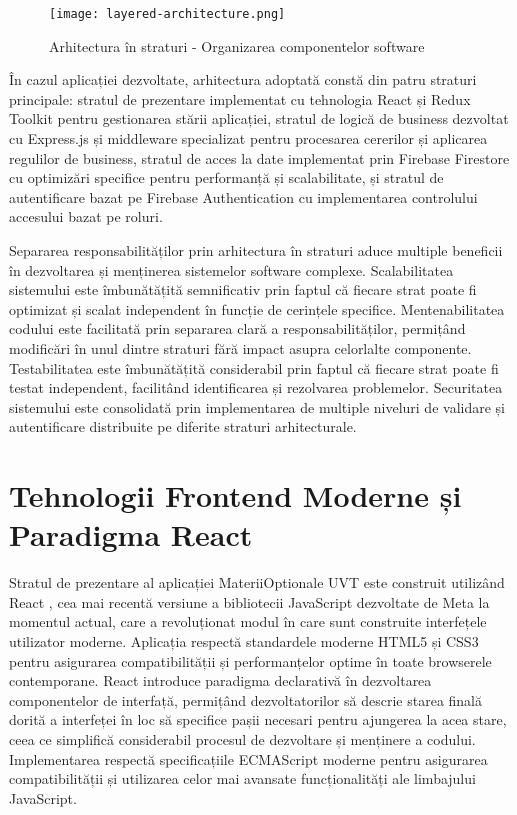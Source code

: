 \documentclass[12pt,a4paper]{report}
\begin{document}
\begin{figure}[H]
\centering
\texttt{[image: layered-architecture.png]}
\caption{Arhitectura în straturi - Organizarea componentelor software}
\label{fig:layered-architecture}
\end{figure}

În cazul aplicației dezvoltate, arhitectura adoptată constă din patru straturi principale: stratul de prezentare implementat cu tehnologia React și Redux Toolkit pentru gestionarea stării aplicației, stratul de logică de business dezvoltat cu Express.js și middleware specializat pentru procesarea cererilor și aplicarea regulilor de business, stratul de acces la date implementat prin Firebase Firestore cu optimizări specifice pentru performanță și scalabilitate, și stratul de autentificare bazat pe Firebase Authentication cu implementarea controlului accesului bazat pe roluri.

Separarea responsabilităților prin arhitectura în straturi aduce multiple beneficii în dezvoltarea și menținerea sistemelor software complexe. Scalabilitatea sistemului este îmbunătățită semnificativ prin faptul că fiecare strat poate fi optimizat și scalat independent în funcție de cerințele specifice. Mentenabilitatea codului este facilitată prin separarea clară a responsabilităților, permițând modificări în unul dintre straturi fără impact asupra celorlalte componente. Testabilitatea este îmbunătățită considerabil prin faptul că fiecare strat poate fi testat independent, facilitând identificarea și rezolvarea problemelor. Securitatea sistemului este consolidată prin implementarea de multiple niveluri de validare și autentificare distribuite pe diferite straturi arhitecturale.



\section{Tehnologii Frontend Moderne și Paradigma React}

Stratul de prezentare al aplicației MateriiOptionale UVT este construit utilizând React \cite{react-docs}, cea mai recentă versiune a bibliotecii JavaScript \cite{javascript-guide} dezvoltate de Meta la momentul actual, care a revoluționat modul în care sunt construite interfețele utilizator moderne. Aplicația respectă standardele moderne HTML5 \cite{html5} și CSS3 \cite{css3} pentru asigurarea compatibilității și performanțelor optime în toate browserele contemporane. React introduce paradigma declarativă în dezvoltarea componentelor de interfață, permițând dezvoltatorilor să descrie starea finală dorită a interfeței în loc să specifice pașii necesari pentru ajungerea la acea stare, ceea ce simplifică considerabil procesul de dezvoltare și menținere a codului. Implementarea respectă specificațiile ECMAScript \cite{ecmascript} moderne pentru asigurarea compatibilității și utilizarea celor mai avansate funcționalități ale limbajului JavaScript.
\end{document}
